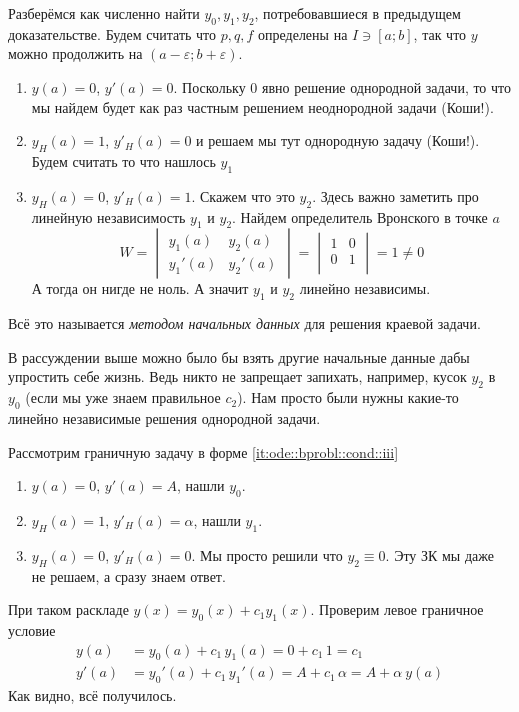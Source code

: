 \documentclass{trlnotes}
\begin{document}
Разберёмся как численно найти $y_0, y_1, y_2$, потребовавшиеся в предыдущем доказательстве.
Будем считать что $p,q,f$ определены на $I \ni [a;b]$, так что $y$ можно продолжить 
на $(a-ε;b+ε)$. 
\begin{enumerate}
  \item $y(a) = 0$, $y'(a) = 0$. Поскольку $0$ явно решение однородной задачи, то что мы
    найдем будет как раз частным решением неоднородной задачи (Коши!).
  \item $y_H(a) = 1$, $y'_H(a) = 0$ и решаем мы тут однородную задачу (Коши!). Будем считать то что
    нашлось $y_1$
  \item $y_H(a) = 0$, $y'_H(a) = 1$. Скажем что это $y_2$. Здесь важно заметить про линейную
    независимость $y_1$ и $y_2$. Найдем определитель Вронского в точке $a$
    \[
      W = \begin{vmatrix}
        y_1(a) & y_2(a) \\
        y_1'(a) & y_2'(a) 
      \end{vmatrix} = 
      \begin{vmatrix}
        1 & 0 \\ 
        0 & 1 \\
      \end{vmatrix} = 1 \neq 0
    \]
    А тогда он нигде не ноль. А значит $y_1$ и $y_2$ линейно независимы.
\end{enumerate}

Всё это называется \emph{методом начальных данных} для решения краевой задачи.

В рассуждении выше можно было бы взять другие начальные данные дабы
упростить себе жизнь. Ведь никто не запрещает запихать, например, кусок $y_2$ в $y_0$
(если мы уже знаем правильное $c_2$). Нам просто были нужны какие-то линейно независимые
решения однородной задачи.

Рассмотрим граничную задачу в форме \ref{it:ode::bprobl::cond::iii}
\begin{enumerate}
  \item $y(a) = 0$, $y'(a) = A$, нашли  $y_0$.
  \item $y_H(a) = 1$, $y'_H(a) = α$, нашли $y_1$.
  \item $y_H(a) = 0$, $y'_H(a) = 0$. Мы просто решили что $y_2 \equiv 0$. Эту ЗК мы даже
    не решаем, а сразу знаем ответ.
\end{enumerate}
При таком раскладе $y(x) = y_0(x) + c_1 y_1(x)$. 
Проверим левое граничное условие 
\[
  \begin{split}
    y(a) &= y_0(a) + c_1\, y_1(a) = 0 + c_1 \, 1 = c_1 \\
    y'(a) &= y_0'(a) + c_1\, y_1'(a) = A + c_1 \, α = A + α\ y(a)
  \end{split}
\]
Как видно, всё получилось.
\end{document}
